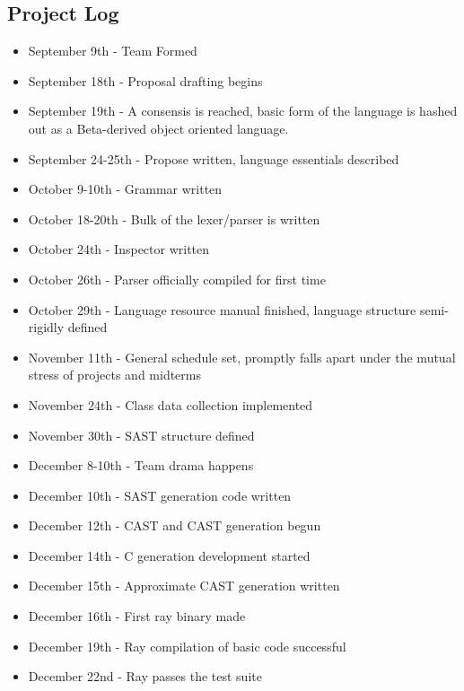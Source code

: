 \pagebreak
\subsection{Project Log}
\begin{itemize}

\item September 9th - Team Formed
\item September 18th - Proposal drafting begins
\item September 19th - A consensis is reached, basic form of the language is hashed out as a Beta-derived object oriented language.
\item September 24-25th - Propose written, language essentials described
\item October 9-10th - Grammar written
\item October 18-20th - Bulk of the lexer/parser is written
\item October 24th - Inspector written
\item October 26th - Parser officially compiled for first time
\item October 29th - Language resource manual finished, language structure semi-rigidly defined
\item November 11th - General schedule set, promptly falls apart under the mutual stress of projects and midterms
\item November 24th - Class data collection implemented
\item November 30th - SAST structure defined
\item December 8-10th - Team drama happens
\item December 10th - SAST generation code written
\item December 12th - CAST and CAST generation begun
\item December 14th - C generation development started
\item December 15th - Approximate CAST generation written
\item December 16th - First ray binary made
\item December 19th - Ray compilation of basic code successful
\item December 22nd - Ray passes the test suite
\end{itemize}